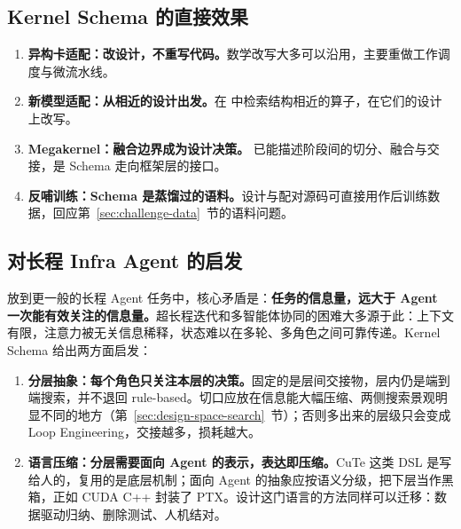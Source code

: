 \SourceSeparator
\subsection{Kernel Schema 的直接效果}\label{sec:near-term}
\begin{enumerate}[start=1]
\item
\textbf{异构卡适配：改设计，不重写代码。}数学改写大多可以沿用，主要重做工作调度与微流水线。


\item
\textbf{新模型适配：从相近的设计出发。}在  中检索结构相近的算子，在它们的设计上改写。


\item
\textbf{Megakernel：融合边界成为设计决策。} 已能描述阶段间的切分、融合与交接，是 Schema 走向框架层的接口。


\item
\textbf{反哺训练：Schema 是蒸馏过的语料。}设计与配对源码可直接用作后训练数据，回应第~\ref{sec:challenge-data}~节的语料问题。


\end{enumerate}

\SourceSeparator
\subsection{对长程 Infra Agent 的启发}\label{sec:lessons}
放到更一般的长程 Agent 任务中，核心矛盾是：\textbf{任务的信息量，远大于 Agent 一次能有效关注的信息量。}超长程迭代和多智能体协同的困难大多源于此：上下文有限，注意力被无关信息稀释，状态难以在多轮、多角色之间可靠传递。Kernel Schema 给出两方面启发：


\begin{enumerate}[start=1]
\item
\textbf{分层抽象：每个角色只关注本层的决策。}固定的是层间交接物，层内仍是端到端搜索，并不退回 rule-based。切口应放在信息能大幅压缩、两侧搜索景观明显不同的地方（第~\ref{sec:design-space-search}~节）；否则多出来的层级只会变成 Loop Engineering，交接越多，损耗越大。


\item
\textbf{语言压缩：分层需要面向 Agent 的表示，表达即压缩。}CuTe 这类 DSL 是写给人的，复用的是底层机制；面向 Agent 的抽象应按语义分级，把下层当作黑箱，正如 CUDA C++ 封装了 PTX。设计这门语言的方法同样可以迁移：数据驱动归纳、删除测试、人机结对。


\end{enumerate}

\SourceSeparator
